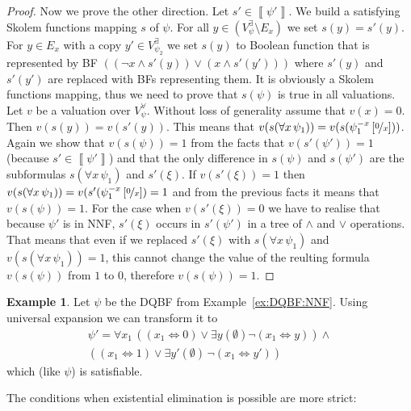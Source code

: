 \documentclass[
  digital, %
  twoside, %
  table,   %
  nolof,     %
  nolot,     %
]{fithesis3}
\theoremstyle{definition}
\newtheorem{example}{Example}
\theoremstyle{remark}
\newcommand{\seman}[1]{\left\llbracket {#1} \right\rrbracket}
\newcommand{\substitute}[2]{\left[ \nicefrac{#2}{#1} \right]}
\newcommand{\evars}[1]{V_{#1}^{\exists}}
\newcommand{\uvars}[1]{V_{#1}^{\forall}}
\newcommand{\lequal}{\Leftrightarrow}
\newcommand{\itholds}{\,}
\begin{document}
\begin{proof}
  Now we prove the other direction. Let $s' \in \seman{\psi'}$. We build a satisfying Skolem functions mapping $s$ of $\psi$. For all $y \in (\evars{\psi} \setminus E_x)$ we set $s(y) = s'(y)$. For $y \in E_x$ with a copy $y' \in \evars{\psi_2}$ we set $s(y)$ to Boolean function that is represented by BF $((\neg x \land s'(y)) \lor (x \land s'(y')))$ where $s'(y)$ and $s'(y')$ are replaced with BFs representing them. It is obviously a Skolem functions mapping, thus we need to prove that $s(\psi)$ is true in all valuations. Let $v$ be a valuation over $\uvars{\psi}$. Without loss of generality assume that $v(x) = 0$. Then $v(s(y)) = v(s'(y))$. This means that $v(s(\forall x \itholds \psi_1)) = v(s(\psi_1^{-x}\substitute{x}{0}))$. Again we show that $v(s(\psi)) = 1$ from the facts that $v(s'(\psi')) = 1$ (because $s' \in \seman{\psi'}$) and that the only difference in $s(\psi)$ and $s(\psi')$ are the subformulas $s(\forall x\itholds\psi_1)$ and $s'(\xi)$. If $v(s'(\xi)) = 1$ then $v(s(\forall x \itholds \psi_1)) = v(s'(\psi_1^{-x}\substitute{x}{0}) = 1$ and from the previous facts it means that $v(s(\psi)) = 1$. For the case when $v(s'(\xi)) = 0$ we have to realise that because $\psi'$ is in NNF, $s'(\xi)$ occurs in $s'(\psi')$ in a tree of ${\land}$ and ${\lor}$ operations. That means that even if we replaced $s'(\xi)$ with $s(\forall x \itholds \psi_1)$ and $v(s(\forall x \itholds \psi_1)) = 1$, this cannot change the value of the reulting formula $v(s(\psi))$ from $1$ to $0$, therefore $v(s(\psi)) = 1$.
\end{proof}
\begin{example}
Let $\psi$ be the DQBF from Example~\ref{ex:DQBF:NNF}. Using universal expansion we can transform it to
\begin{multline*}
    \psi' = \forall x_1 \itholds ((x_1 \lequal 0) \lor \exists y (\emptyset) \neg(x_1 \lequal y)) \land {}\\
    ((x_1 \lequal 1) \lor \exists y' (\emptyset)\itholds\neg(x_1 \lequal y'))
\end{multline*}
which (like $\psi$) is satisfiable.
\end{example}

The conditions when existential elimination is possible are more strict:
\end{document}
